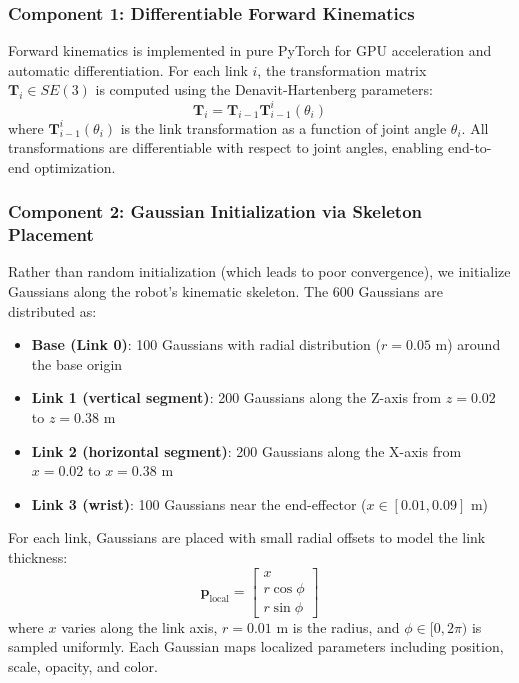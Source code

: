 \documentclass[12pt,a4paper,oneside]{report}
\begin{document}
\subsubsection{Component 1: Differentiable Forward Kinematics}

Forward kinematics is implemented in pure PyTorch for GPU acceleration and automatic differentiation. For each link $i$, the transformation matrix $\mathbf{T}_i \in SE(3)$ is computed using the Denavit-Hartenberg parameters:
\begin{equation}
\mathbf{T}_i = \mathbf{T}_{i-1} \mathbf{T}_{i-1}^{i}(\theta_i)
\end{equation}
where $\mathbf{T}_{i-1}^{i}(\theta_i)$ is the link transformation as a function of joint angle $\theta_i$. All transformations are differentiable with respect to joint angles, enabling end-to-end optimization.

\subsubsection{Component 2: Gaussian Initialization via Skeleton Placement}

Rather than random initialization (which leads to poor convergence), we initialize Gaussians along the robot's kinematic skeleton. The 600 Gaussians are distributed as:
\begin{itemize}
    \item \textbf{Base (Link 0)}: 100 Gaussians with radial distribution ($r = 0.05$ m) around the base origin
    \item \textbf{Link 1 (vertical segment)}: 200 Gaussians along the Z-axis from $z=0.02$ to $z=0.38$ m
    \item \textbf{Link 2 (horizontal segment)}: 200 Gaussians along the X-axis from $x=0.02$ to $x=0.38$ m
    \item \textbf{Link 3 (wrist)}: 100 Gaussians near the end-effector ($x \in [0.01, 0.09]$ m)
\end{itemize}
For each link, Gaussians are placed with small radial offsets to model the link thickness:
\begin{equation}
\mathbf{p}_{\text{local}} = \begin{bmatrix} x \\ r \cos\phi \\ r \sin\phi \end{bmatrix}
\end{equation}
where $x$ varies along the link axis, $r = 0.01$ m is the radius, and $\phi \in [0, 2\pi)$ is sampled uniformly. Each Gaussian maps localized parameters including position, scale, opacity, and color.
\end{document}
